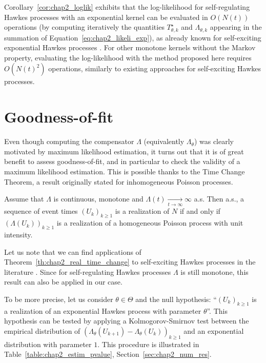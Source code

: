 Corollary~\ref{cor:chap2_loglik} exhibits that the log-likelihood for
self-regulating Hawkes processes with an exponential kernel can be evaluated in $O(N(t))$ operations (by computing iteratively the quantities $T_{\theta, k}^\star$ and $\Lambda_{\theta, k}$ appearing in the summation of Equation~\eqref{eq:chap2_likeli_exp}),
as already known
for self-exciting exponential Hawkes processes \textcite[Chapter 4.2]{Laub2014}.
For other monotone kernels without the Markov property, evaluating the log-likelihood with the method proposed here requires $O(N(t)^2)$ operations, similarly to existing approaches for self-exciting Hawkes processes.

\section{Goodness-of-fit}
\label{sec:chap2_goodness}

Even though computing the compensator $\Lambda$ (equivalently $\Lambda_\theta$) was clearly motivated by maximum likelihood estimation, it turns out that it is of great benefit to assess goodness-of-fit, and in particular to check the validity of a maximum likelihood estimation.
This is possible thanks to the Time Change Theorem, a result originally stated for inhomogeneous Poisson processes.

\begin{theorem}\label{th:chap2_real_time_change}
  Assume that $\Lambda$ is continuous, monotone and $\Lambda(t)\xrightarrow[t\rightarrow \infty]{} \infty$ a.s.
  Then a.s., a sequence of event times $(U_k)_{k\ge 1}$ is a realization of $N$ if and only if $(\Lambda(U_k))_{k \ge 1}$ is a realization of a homogeneous Poisson process with unit intensity.
\end{theorem}

Let us note that we can find applications of Theorem~\ref{th:chap2_real_time_change} to self-exciting Hawkes processes in the literature \parencite[Chapter 5]{Laub2014}.
Since for self-regulating Hawkes processes \(\Lambda\) is still monotone, this result can also be applied in our case.

To be more precise, let us consider \(\theta \in \Theta\) and the null hypothesis: ``$(U_k)_{k\ge 1}$ is a realization of an exponential Hawkes process with parameter \(\theta\)''.
This hypothesis can be tested by applying a Kolmogorov-Smirnov test between the empirical distribution of $\left( \Lambda_\theta(U_{k+1}) - \Lambda_\theta(U_k) \right)_{k \ge 1}$ and an exponential distribution with parameter \(1\).
This procedure is illustrated in Table~\ref{table:chap2_estim_pvalue}, Section~\ref{sec:chap2_num_res}.

